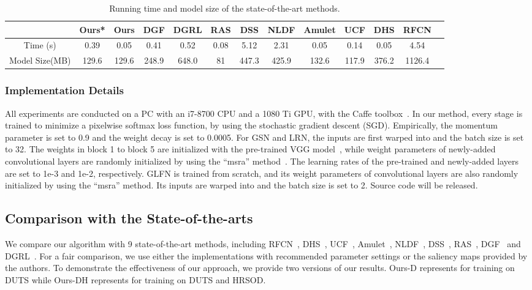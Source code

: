 \documentclass[10pt,twocolumn,letterpaper]{article}
\begin{document}
\begin{table*}[htp]
\begin{center}
\label{tab:runtime}
\vspace{-2mm}
\begin{tabular}{|c|c|c|c|c|c|c|c|c|c|c|c|c|}
\hline
&Ours*&Ours&DGF&DGRL&RAS&DSS&NLDF&Amulet&UCF&DHS&RFCN \\
\cline{2-9}
\hline
Time (s)&0.39&0.05&0.41&0.52&0.08&5.12&2.31&0.05&0.14&0.05&4.54\\
\hline
Model Size(MB) &129.6&129.6&248.9&648.0&81&447.3&425.9&132.6&117.9&376.2&1126.4\\

\hline
\end{tabular}
\vspace{-2mm}
\end{center}
\caption{Running time and model size of the state-of-the-art methods.}\label{tab:time}
\vspace{-3mm}
\end{table*}
\subsubsection{Implementation Details}

All experiments are conducted on a PC with an i7-8700 CPU and a 1080 Ti GPU, with the Caffe toolbox~\cite{jia2014caffe}.
In our method, every stage is trained to minimize a pixelwise softmax loss function, by using the stochastic gradient descent (SGD). Empirically, the momentum parameter is set to 0.9 and the weight decay is set to 0.0005.
For GSN and LRN, the inputs are first warped into  and the batch size is set to 32. The weights in block 1 to block 5 are initialized with the pre-trained VGG model~\cite{simonyan2014very}, while weight parameters of newly-added convolutional layers are randomly initialized by using the ``msra'' method~\cite{he2015delving}. The learning rates of the pre-trained and newly-added layers are set to 1e-3 and 1e-2, respectively. GLFN is trained from scratch, and its weight parameters of convolutional layers are also randomly initialized by using the ``msra'' method. Its inputs are warped into  and the batch size is set to 2. Source code will be released.

\subsection{Comparison with the State-of-the-arts}
We compare our algorithm with 9 state-of-the-art methods, including
RFCN~\cite{wang2016saliency}, DHS~\cite{liu2016dhsnet}, UCF~\cite{zhang2017learning}, Amulet~\cite{zhang2017amulet}, NLDF~\cite{luo2017non}, DSS~\cite{hou2017deeply}, RAS~\cite{chen2018reverse}, DGF~\cite{wu2018fast} and DGRL~\cite{wang2018detect}. For a fair comparison, we use either the implementations with recommended parameter settings
or the saliency maps provided by the authors. To demonstrate the effectiveness of our approach, we provide two versions of our results. Ours-D represents for training on DUTS while Ours-DH represents for training on DUTS and HRSOD.
\end{document}
